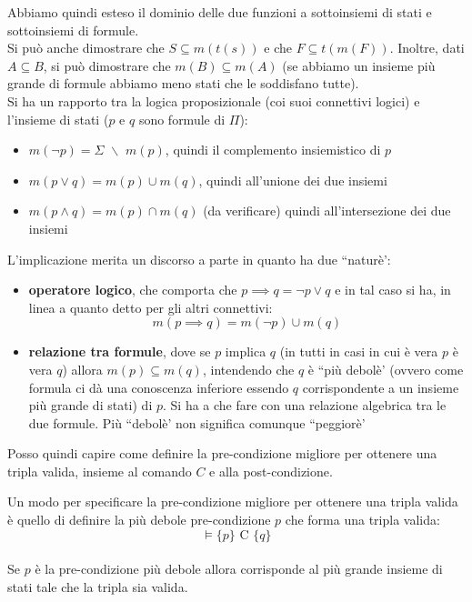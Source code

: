				      				Abbiamo quindi esteso il dominio delle due funzioni a sottoinsiemi di stati e
				      				sottoinsiemi di formule.\\
				      				Si può anche dimostrare che $S\subseteq m(t(s))$ e che $F\subseteq
				      				t(m(F))$. Inoltre, dati $A\subseteq B$, si può dimostrare che $m(B)\subseteq
				      				m(A)$ (se abbiamo un insieme più grande di formule abbiamo meno stati che le soddisfano
				      				tutte).\\
				      				Si ha un rapporto tra la logica proposizionale (coi suoi connettivi logici) e
				      				l'insieme di stati ($p$ e $q$ sono formule di $\Pi$): 
				      				\begin{itemize}
				      					\item $m(\neg p)=\Sigma \,\,\backslash \,\, m(p)$, quindi il complemento
				      					      insiemistico di $p$
				      					\item $m(p\lor q)=m(p)\cup m(q)$, quindi all'unione dei due insiemi  
				      					\item $m(p\land q)=m(p)\cap m(q)$ (da verificare) quindi all'intersezione dei
				      					      due insiemi
				      				\end{itemize}
				      				L'implicazione merita un discorso a parte in quanto ha due ``naturè':
				      				\begin{itemize}
				      					\item \textbf{operatore logico}, che comporta che $p\implies q= \neg p\lor q$
				      					      e in tal caso si ha, in linea a quanto detto per gli altri connettivi:
				      					      \[m(p\implies q)= m(\neg p)\cup m(q)\]
				      					\item \textbf{relazione tra formule}, dove se $p$ implica $q$ (in tutti in
				      					      casi in cui è vera $p$ è vera $q$) allora
				      					      $m(p)\subseteq m(q)$, intendendo che $q$ è ``più debolè' (ovvero come formula
				      					      ci dà una conoscenza inferiore essendo $q$ corrispondente a un insieme più
				      					      grande di stati) di $p$. Si ha a che
				      					      fare con una relazione algebrica tra le due formule. Più ``debolè' non
				      					      significa comunque ``peggiorè'
				      				\end{itemize}
				      				Posso quindi capire come definire la pre-condizione migliore per ottenere una
				      				tripla valida, insieme al comando $C$ e alla post-condizione.\\
				      			    \begin{definizione}
				      			        Un modo per specificare la pre-condizione migliore per ottenere una
				      				tripla valida è quello di definire la più
				      				debole pre-condizione $p$ che forma una tripla valida:
				      				\[\vDash \{p\}\mbox{ C }\{q\}\] \\
				      				Se $p$ è la pre-condizione più debole allora corrisponde al più grande insieme di
				      				stati tale che la tripla sia valida.
				      			    \end{definizione} \vspace{5mm} %
